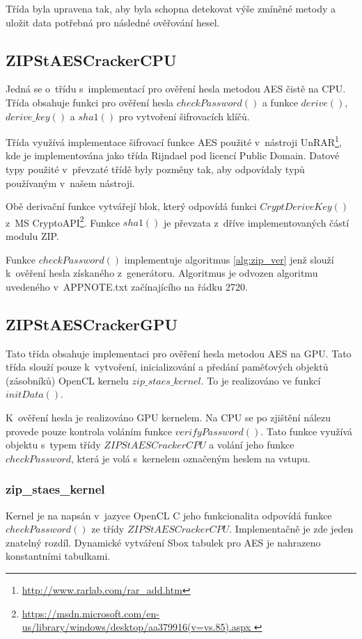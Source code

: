  Třída byla upravena tak, aby byla schopna detekovat výše zmíněné metody a uložit data potřebná pro
následné ověřování hesel.

\subsection{ZIPStAESCrackerCPU}
Jedná se o~třídu s~implementací pro ověření hesla metodou AES čistě na CPU. Třída obsahuje funkci
pro ověření hesla $checkPassword()$ a funkce $derive()$, $derive\_key()$ a $sha1()$ pro vytvoření
šifrovacích klíčů.

Třída využívá implementace šifrovací funkce AES použité v~nástroji
UnRAR\footnote{\url{http://www.rarlab.com/rar\_add.htm}}, kde je implementována jako třída Rijndael
pod licencí Public Domain. Datové typy použité v~převzaté třídě byly pozměny tak, aby odpovídaly
typů používaným v~našem nástroji.

Obě derivační funkce vytvářejí blok, který odpovídá funkci $CryptDeriveKey()$ z~MS
CryptoAPI\footnote{\url{https://msdn.microsoft.com/en-us/library/windows/desktop/aa379916(v=vs.85).aspx
}}. Funkce $sha1()$ je převzata z~dříve implementovaných částí modulu ZIP.

 Funkce $checkPassword()$ implementuje algoritmus \ref{alg:zip_ver} jenž slouží k~ověření hesla
získaného z~generátoru. Algoritmus je odvozen algoritmu uvedeného v~APPNOTE.txt začínajícího na
řádku 2720.

\subsection{ZIPStAESCrackerGPU}
Tato třída obsahuje implementaci pro ověření hesla metodou AES na GPU. Tato třída slouží pouze
k~vytvoření, inicializování a předání paměťových objektů (zásobníků) OpenCL kernelu
$zip\_staes\_kernel$. To je realizováno ve funkcí $initData()$. 

 K~ověření hesla je realizováno GPU kernelem. Na CPU se po zjištění nálezu provede pouze
kontrola voláním funkce $verifyPassword()$. Tato funkce využívá objektu s~typem třídy
$ZIPStAESCrackerCPU$ a volání jeho funkce $checkPassword$, která je volá s~kernelem označeným
heslem na vstupu.

\subsubsection{zip\_staes\_kernel}
Kernel je na napsán v~jazyce OpenCL C jeho funkcionalita odpovídá funkce $checkPassword()$ ze
třídy $ZIPStAESCrackerCPU$. Implementačně je zde jeden znatelný rozdíl. Dynamické vytváření Sbox
tabulek pro AES je nahrazeno konstantními tabulkami.
 
